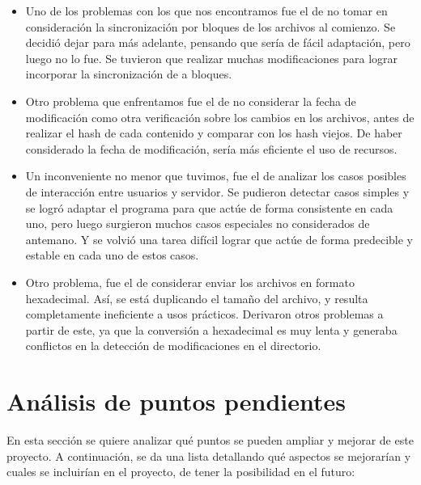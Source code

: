 \documentclass{article}
\begin{document}
\begin{itemize}
\item Uno de los problemas con los que nos encontramos fue el de no tomar en consideración la sincronización por bloques de los archivos al comienzo. Se decidió dejar para más adelante, pensando que sería de fácil adaptación, pero luego no lo fue. Se tuvieron que realizar muchas modificaciones para lograr incorporar la sincronización de a bloques.
\item Otro problema que enfrentamos fue el de no considerar la fecha de modificación como otra verificación sobre los cambios en los archivos, antes de realizar el hash de cada contenido y comparar con los hash viejos. De haber considerado la fecha de modificación, sería más eficiente el uso de recursos.
\item Un inconveniente no menor que tuvimos, fue el de analizar los casos posibles de interacción entre usuarios y servidor. Se pudieron detectar casos simples y se logró adaptar el programa para que actúe de forma consistente en cada uno, pero luego surgieron muchos casos especiales no considerados de antemano. Y se volvió una tarea difícil lograr que actúe de forma predecible y estable en cada uno de estos casos.
\item Otro problema, fue el de considerar enviar los archivos en formato hexadecimal. Así, se está duplicando el tamaño del archivo, y resulta completamente ineficiente a usos prácticos. Derivaron otros problemas a partir de este, ya que la conversión a hexadecimal es muy lenta y generaba conflictos en la detección de modificaciones en el directorio.
\end{itemize}
\bigskip




\section{Análisis de puntos pendientes}

	En esta sección se quiere analizar qué puntos se pueden ampliar y mejorar de este proyecto. A continuación, se da una lista detallando qué aspectos se mejorarían y cuales se incluirían en el proyecto, de tener la posibilidad en el futuro:
\end{document}

